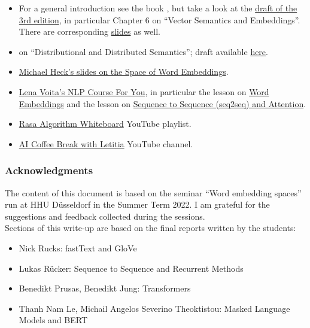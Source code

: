 \documentclass[11pt, a4paper]{amsart}
\begin{document}
\begin{itemize}
    \item For a general introduction see the book \cite{jurafsky2009speech}, but take a look at the \href{https://web.stanford.edu/~jurafsky/slp3/}{draft of the 3rd edition}, in particular Chapter 6 on ``Vector Semantics and Embeddings''.
    There are corresponding \href{https://web.stanford.edu/~jurafsky/slp3/slides/6_Vector_Apr18_2021.pdf}{slides} as well.

    \item \cite[Chp.~14]{eisenstein2019introduction} on ``Distributional and Distributed Semantics'';
    draft available \href{https://github.com/jacobeisenstein/gt-nlp-class/blob/master/notes/eisenstein-nlp-notes.pdf}{here}.

    \item \href{https://www.cs.hhu.de/fileadmin/redaktion/Fakultaeten/Mathematisch-Naturwissenschaftliche_Fakultaet/Informatik/Dialog_Systems_and_Machine_Learning/20190705_word_embeddings.pdf}{Michael Heck's slides on the Space of Word Embeddings}.
    
    \item \href{https://lena-voita.github.io/nlp_course}{Lena Voita's NLP Course For You}, in particular the lesson on \href{https://lena-voita.github.io/nlp_course/word_embeddings}{Word Embeddings} and the lesson on \href{https://lena-voita.github.io/nlp_course/seq2seq_and_attention.html}{Sequence to Sequence (seq2seq) and Attention}.
    
    \item \href{https://youtube.com/playlist?list=PL75e0qA87dlG-za8eLI6t0_Pbxafk-cxb}{Rasa Algorithm Whiteboard} YouTube playlist.
    
    \item \href{https://www.youtube.com/c/aicoffeebreak}{AI Coffee Break with Letitia} YouTube channel.
\end{itemize}

\subsubsection{Acknowledgments}

The content of this document is based on the seminar ``Word embedding spaces'' run at HHU Düsseldorf in the Summer Term 2022.
I am grateful for the suggestions and feedback collected during the sessions. \\
Sections of this write-up are based on the final reports written by the students:
\begin{itemize}
	\item Nick Rucks: fastText and GloVe
	\item Lukas Rücker: Sequence to Sequence and Recurrent Methods
	\item Benedikt Prusas, Benedikt Jung: Transformers
	\item Thanh Nam Le, Michail Angelos Severino Theoktistou: Masked Language Models and BERT
\end{itemize}
\end{document}
